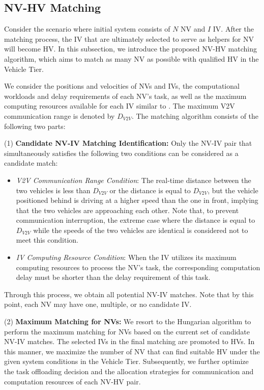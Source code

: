 \documentclass[lettersize,journal]{IEEEtran}
\begin{document}
\subsection{NV-HV Matching}

Consider the scenario where initial system consists of $N$ NV and $I$ IV. After the matching process, the IV that are ultimately selected to serve as helpers for NV will become HV. In this subsection, we introduce the proposed NV-HV matching algorithm, which aims to match as many NV as possible with qualified HV in the Vehicle Tier.

We consider the positions and velocities of NVs and IVs, the computational workloads and delay requirements of each NV's task, as well as the maximum computing resources available for each IV similar to \cite{ref29}. The maximum V2V communication range is denoted by $D_{V2V}$. The matching algorithm consists of the following two parts:

(1) \textbf{Candidate NV-IV Matching Identification:} Only the NV-IV pair that simultaneously satisfies the following two conditions can be considered as a candidate match:
\begin{itemize} 

\item \textit{V2V Communication Range Condition}: The real-time distance between the two vehicles is less than $D_{V2V}$ or the distance is equal to $D_{V2V}$, but the vehicle positioned behind is driving at a higher speed than the one in front, implying that the two vehicles are approaching each other. Note that, to prevent communication interruption, the extreme case where the distance is equal to $D_{V2V}$ while the speeds of the two vehicles are identical is considered not to meet this condition.

\item \textit{IV Computing Resource Condition}: When the IV utilizes its maximum computing resources to process the NV's task, the corresponding computation delay must be shorter than the delay requirement of this task.

\end{itemize}
Through this process, we obtain all potential NV-IV matches. Note that by this point, each NV may have one, multiple, or no candidate IV.

(2) \textbf{Maximum Matching for NVs:} We resort to the Hungarian algorithm \cite{ref30} to perform the maximum matching for NVs based on the current set of candidate NV-IV matches. The selected IVs in the final matching are promoted to HVs. In this manner, we maximize the number of NV that can find suitable HV under the given system conditions in the Vehicle Tier. Subsequently, we further optimize the task offloading decision and the allocation strategies for communication and computation resources of each NV-HV pair.
\end{document}
